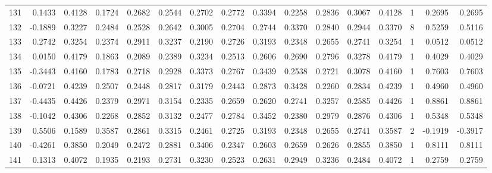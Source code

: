 \begin{tabular}{lrrrrrrrrrrrrrrr}
131 &      0.1433 &  0.4128 &  0.1724 &  0.2682 &  0.2544 &  0.2702 &  0.2772 &  0.3394 &  0.2258 &  0.2836 &   0.3067 &     0.4128 &      1 &                    0.2695 &                     0.2695 \\
132 &     -0.1889 &  0.3227 &  0.2484 &  0.2528 &  0.2642 &  0.3005 &  0.2704 &  0.2744 &  0.3370 &  0.2840 &   0.2944 &     0.3370 &      8 &                    0.5259 &                     0.5116 \\
133 &      0.2742 &  0.3254 &  0.2374 &  0.2911 &  0.3237 &  0.2190 &  0.2726 &  0.3193 &  0.2348 &  0.2655 &   0.2741 &     0.3254 &      1 &                    0.0512 &                     0.0512 \\
134 &      0.0150 &  0.4179 &  0.1863 &  0.2089 &  0.2389 &  0.3234 &  0.2513 &  0.2606 &  0.2690 &  0.2796 &   0.3278 &     0.4179 &      1 &                    0.4029 &                     0.4029 \\
135 &     -0.3443 &  0.4160 &  0.1783 &  0.2718 &  0.2928 &  0.3373 &  0.2767 &  0.3439 &  0.2538 &  0.2721 &   0.3078 &     0.4160 &      1 &                    0.7603 &                     0.7603 \\
136 &     -0.0721 &  0.4239 &  0.2507 &  0.2448 &  0.2817 &  0.3179 &  0.2443 &  0.2873 &  0.3428 &  0.2260 &   0.2834 &     0.4239 &      1 &                    0.4960 &                     0.4960 \\
137 &     -0.4435 &  0.4426 &  0.2379 &  0.2971 &  0.3154 &  0.2335 &  0.2659 &  0.2620 &  0.2741 &  0.3257 &   0.2585 &     0.4426 &      1 &                    0.8861 &                     0.8861 \\
138 &     -0.1042 &  0.4306 &  0.2268 &  0.2852 &  0.3132 &  0.2477 &  0.2784 &  0.3452 &  0.2380 &  0.2979 &   0.2876 &     0.4306 &      1 &                    0.5348 &                     0.5348 \\
139 &      0.5506 &  0.1589 &  0.3587 &  0.2861 &  0.3315 &  0.2461 &  0.2725 &  0.3193 &  0.2348 &  0.2655 &   0.2741 &     0.3587 &      2 &                   -0.1919 &                    -0.3917 \\
140 &     -0.4261 &  0.3850 &  0.2049 &  0.2472 &  0.2881 &  0.3406 &  0.2347 &  0.2603 &  0.2659 &  0.2626 &   0.2855 &     0.3850 &      1 &                    0.8111 &                     0.8111 \\
141 &      0.1313 &  0.4072 &  0.1935 &  0.2193 &  0.2731 &  0.3230 &  0.2523 &  0.2631 &  0.2949 &  0.3236 &   0.2484 &     0.4072 &      1 &                    0.2759 &                     0.2759 \\

\end{tabular}
